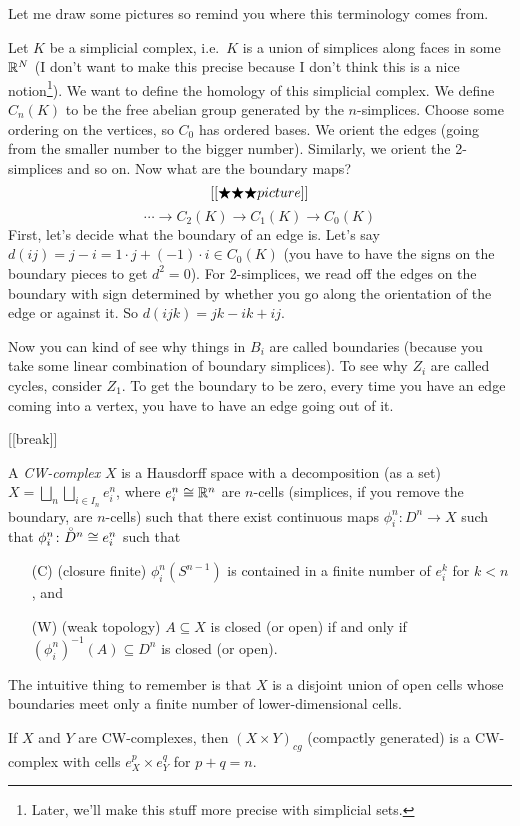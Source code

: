 Let me draw some pictures so remind you where this terminology comes from.
\begin{example}[Poincar\'e]
 Let $K$ be a simplicial complex, i.e.~$K$ is a union of simplices along faces in some $\mathbb{R}^N$ (I don't want to make this precise because I don't think this is a nice notion\footnote{Later, we'll make this stuff more precise with simplicial sets.}). We want to define the homology of this simplicial complex. We define $C_n(K)$ to be the free abelian group generated by the $n$-simplices. Choose some ordering on the vertices, so $C_0$ has ordered bases. We orient the edges (going from the smaller number to the bigger number). Similarly, we orient the 2-simplices and so on. Now what are the boundary maps?
 \[
  [[\bigstar\bigstar\bigstar picture]]
 \]
 \[
  \cdots \to C_2(K)\to C_1(K)\to C_0(K)
 \]
 First, let's decide what the boundary of an edge is. Let's say $d(ij)=j-i=1\cdot j + (-1)\cdot i\in C_0(K)$ (you have to have the signs on the boundary pieces to get $d^2=0$). For 2-simplices, we read off the edges on the boundary with sign determined by whether you go along the orientation of the edge or against it. So $d(ijk)=jk-ik+ij$.
 
 Now you can kind of see why things in $B_i$ are called boundaries (because you take some linear combination of boundary simplices). To see why $Z_i$ are called cycles, consider $Z_1$. To get the boundary to be zero, every time you have an edge coming into a vertex, you have to have an edge going out of it.
\end{example}

[[break]]


A \emph{CW-complex} $X$ is a Hausdorff space with a decomposition (as a set) $X=\bigsqcup_n \bigsqcup_{i\in I_n} e_i^n$, where $e_i^n\cong \mathbb{R}^n$ are $n$-cells (simplices, if you remove the boundary, are $n$-cells) such that there exist continuous maps $\phi_i^n\colon D^n\to X$ such that $\phi_i^n\colon \accentset{\circ}{D}^n\cong e_i^n$ such that
\begin{itemize}
 \item[(C)] (closure finite) $\phi_i^n(S^{n-1})$ is contained in a finite number of $e_i^k$ for $k<n$, and
 \item[(W)] (weak topology) $A\subseteq X$ is closed (or open) if and only if $(\phi_i^n)^{-1}(A)\subseteq D^n$ is closed (or open).
\end{itemize}
The intuitive thing to remember is that $X$ is a disjoint union of open cells whose boundaries meet only a finite number of lower-dimensional cells.
\begin{lemma}
 If $X$ and $Y$ are CW-complexes, then $(X\times Y)_{cg}$ (compactly generated) is a CW-complex with cells $e_X^p\times e_Y^q$ for $p+q=n$.
\end{lemma}


